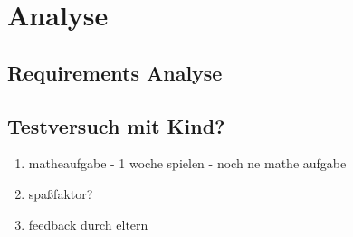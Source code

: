 \section{Analyse}
\subsection{Requirements Analyse}
\subsection{Testversuch mit Kind?}
	\begin{enumerate}
		\item{ matheaufgabe - 1 woche spielen - noch ne mathe aufgabe }
		\item{ spaßfaktor? }
		\item{ feedback durch eltern }
	\end{enumerate}
